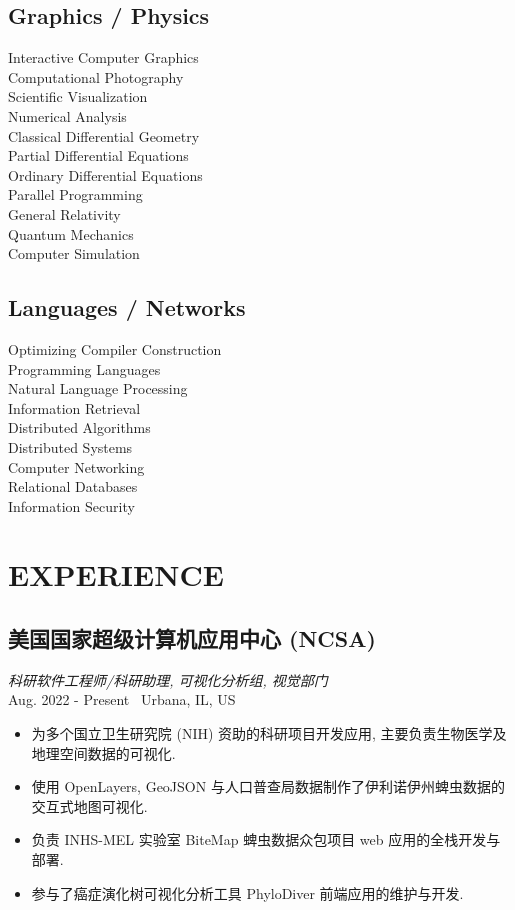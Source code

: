 \documentclass[11pt,twocolumn]{article}
\begin{document}
\subsection*{{Graphics / Physics}}
Interactive Computer Graphics\\
Computational Photography\\
Scientific Visualization\\
Numerical Analysis\\
Classical Differential Geometry\\
Partial Differential Equations\\
Ordinary Differential Equations\\
Parallel Programming\\
General Relativity\\
Quantum Mechanics\\
Computer Simulation

\subsection*{{Languages / Networks}}
Optimizing Compiler Construction\\
Programming Languages\\
Natural Language Processing\\
Information Retrieval\\
Distributed Algorithms\\
Distributed Systems\\
Computer Networking\\
Relational Databases\\
Information Security\\

\newpage

\section*{\textnormal{EXPERIENCE}}

\subsection*{美国国家超级计算机应用中心 (NCSA)}
\textit{科研软件工程师/科研助理, 可视化分析组, 视觉部门}\\
Aug. 2022 - Present \textbullet\ Urbana, IL, US
\begin{itemize}
\item 为多个国立卫生研究院 (NIH) 资助的科研项目开发应用, 主要负责生物医学及地理空间数据的可视化.
\item 使用 OpenLayers, GeoJSON 与人口普查局数据制作了伊利诺伊州蜱虫数据的交互式地图可视化.
\item 负责 INHS-MEL 实验室 BiteMap 蜱虫数据众包项目 web 应用的全栈开发与部署.
\item 参与了癌症演化树可视化分析工具 PhyloDiver 前端应用的维护与开发.
\end{itemize}
\end{document}
